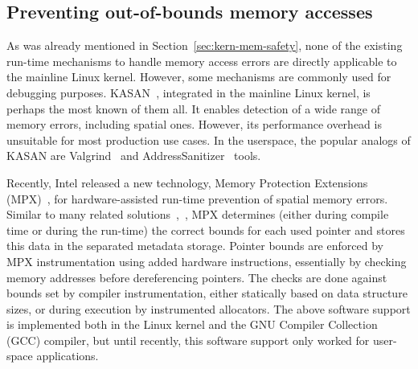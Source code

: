 \subsection{Preventing out-of-bounds memory accesses}
\label{sec:kern-mem-out-of-bounds}

As was already mentioned in Section~\ref{sec:kern-mem-safety}, none of the existing run-time mechanisms to handle memory access errors are directly applicable to the mainline Linux kernel. However, some mechanisms are commonly used for debugging purposes.
KASAN~\cite{kasan}, integrated in the mainline Linux kernel, is perhaps the most known of them all. It enables detection of a wide range of memory errors, including spatial ones. However, its performance overhead is unsuitable for most production use cases.
In the userspace, the popular analogs of KASAN are Valgrind~\cite{nethercote2007valgrind} and AddressSanitizer~\cite{serebryany2012addresssanitizer} tools. 

Recently, Intel released a new technology, \intel Memory Protection Extensions (MPX)~\cite{ramakesavan2015intel}, for hardware-assisted run-time prevention of spatial memory errors.  Similar to many related solutions~\cite{jones1997backwards},~\cite{nagarakatte2009softbound}, MPX determines (either during compile time or during the run-time) the correct bounds for each used pointer and stores this data in the separated metadata storage. Pointer bounds are enforced by MPX instrumentation using added hardware instructions, essentially by checking memory addresses before dereferencing pointers. The checks are done against bounds set by compiler instrumentation, either statically based on data structure sizes, or during execution by instrumented allocators. The above software support is implemented both in the Linux kernel and the GNU Compiler Collection (GCC) compiler, but until recently, this software support only worked for user-space applications. 
 
